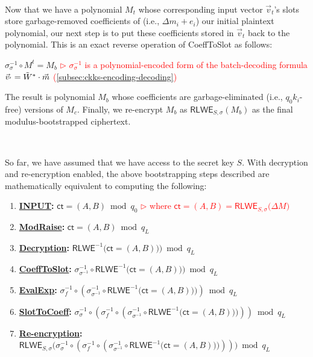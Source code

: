 $ $

Now that we have a polynomial $M_t$ whose corresponding input vector $\vec{v}_t$'s slots store garbage-removed coefficients of (i.e., $\Delta m_i + e_i$) our initial plaintext polynomial, our next step is to put these coefficients stored in $\vec{v}_t$ back to the polynomial. This is an exact reverse operation of \textsf{CoeffToSlot} as follows:

$\sigma^{-1}_{\sigma} \circ M^t = M_b$ 
\textcolor{red}{ $\rhd$ $\sigma^{-1}_{\sigma}$ is a polynomial-encoded form of the batch-decoding formula $\vec{v}_{'} = \tilde W^* \cdot \vec{m}$ (\autoref{subsec:ckks-encoding-decoding})}

The result is polynomial $M_b$ whose coefficients are garbage-eliminated (i.e., $q_0k_i$-free) versions of $M_c$. Finally, we re-encrypt $M_b$ as $\textsf{RLWE}_{S, \sigma}(M_b)$ as the final modulus-bootstrapped ciphertext. 


$ $

 So far, we have assumed that we have access to the secret key $S$. With decryption and re-encryption enabled, the above bootstrapping steps described are mathematically equivalent to computing the following:

\begin{enumerate}
\item \textsf{\textbf{\underline{INPUT}:}} $\textsf{ct} = (A, B) \bmod q_0$ \textcolor{red}{ $\rhd$ where $\textsf{ct}=(A, B) = \textsf{RLWE}_{S, \sigma}\bm(\Delta M \bm)$}

\item \textsf{\textbf{\underline{ModRaise}:}} $\textsf{ct} = (A, B) \bmod q_L$

\item \textsf{\textbf{\underline{Decryption}:}} 
$\textsf{RLWE}^{-1}\textbf{(}\textsf{ct} = (A, B)\textbf{)} \textbf{)} \bmod q_L$

\item \textsf{\textbf{\underline{CoeffToSlot}:}} $\sigma^{-1}_{\sigma^{-1}} \circ \textsf{RLWE}^{-1}\textbf{(}\textsf{ct} = (A, B)\textbf{)} \textbf{)} \bmod q_L$

\item \textsf{\textbf{\underline{EvalExp}:}} $\sigma^{-1}_f \circ (\sigma^{-1}_{\sigma^{-1}} \circ \textsf{RLWE}^{-1}\textbf{(}\textsf{ct} = (A, B)\textbf{)} \textbf{)}) \bmod q_L$

\item \textsf{\textbf{\underline{SlotToCoeff}:}} $\sigma^{-1}_{\sigma} \circ (\sigma^{-1}_f \circ (\sigma^{-1}_{\sigma^{-1}} \circ \textsf{RLWE}^{-1}\textbf{(}\textsf{ct} = (A, B)\textbf{)} \textbf{)})) \bmod q_L$

\item \textsf{\textbf{\underline{Re-encryption}:}} $\textsf{RLWE}_{S, \sigma}\bm(\sigma^{-1}_{\sigma} \circ (\sigma^{-1}_f \circ (\sigma^{-1}_{\sigma^{-1}} \circ \textsf{RLWE}^{-1}\textbf{(}\textsf{ct} = (A, B)\textbf{)} \textbf{)}))\bm) \bmod q_L$

\end{enumerate}

